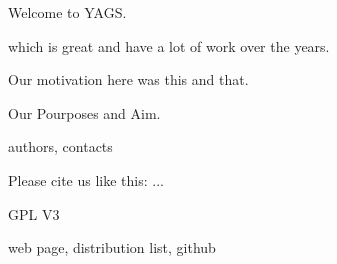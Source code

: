 

Welcome to YAGS.

which is great and have a lot of work over the years. 

Our motivation here was this and that.

Our Pourposes and Aim.

authors, contacts



 Please cite us like this: ... 



GPL V3 



web page, distribution list, github


